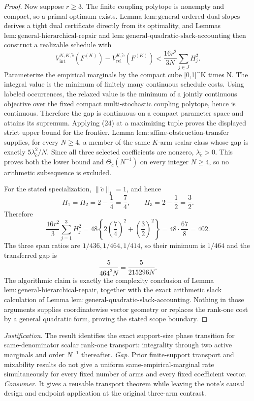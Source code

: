 \documentclass{article}
\begin{document}
\begin{proof}
Now suppose \(r\ge3\).  The finite coupling polytope is nonempty and compact, so a primal optimum exists.  Lemma \(\mathrm{lem{:}general\mbox{-}ordered\mbox{-}dual\mbox{-}slopes}\) derives a tight dual certificate directly from its optimality, and Lemmas \(\mathrm{lem{:}general\mbox{-}hierarchical\mbox{-}repair}\) and \(\mathrm{lem{:}general\mbox{-}quadratic\mbox{-}slack\mbox{-}accounting}\) then construct a realizable schedule with
\[
 V_{\mathrm{int}}^{N,K,\widetilde c}(F^{(K)})-
 V_{\mathrm{rel}}^{K,\widetilde c}(F^{(K)})
 <\frac{16r^2}{3N}\sum_{j\in J}H_j^2. \tag{24}
\]
Parameterize the empirical marginals by the compact cube [0,1]\textasciicircum{}{K times N}.  The integral value is the minimum of finitely many continuous schedule costs.  Using labeled occurrences, the relaxed value is the minimum of a jointly continuous objective over the fixed compact multi-stochastic coupling polytope, hence is continuous.  Therefore the gap is continuous on a compact parameter space and attains its supremum.  Applying (24) at a maximizing tuple proves the displayed strict upper bound for the frontier.  Lemma \(\mathrm{lem{:}affine\mbox{-}obstruction\mbox{-}transfer}\) supplies, for every \(N\ge4\), a member of the same \(K\)-arm scalar class whose gap is exactly \(5\lambda_{\widetilde c}^2/N\).  Since all three selected coefficients are nonzero, \(\lambda_{\widetilde c}>0\).  This proves both the lower bound and \(\Theta_{\widetilde c}(N^{-1})\) on every integer \(N\ge4\), so no arithmetic subsequence is excluded.

For the stated specialization, \(\|\widetilde c\|_1=1\), and hence
\[
 H_1=H_2=2-\frac14=\frac74,\qquad H_3=2-\frac12=\frac32.
\]
Therefore
\[
 \frac{16r^2}{3}\sum_{j=1}^3H_j^2
 =48\left\{2\left(\frac74\right)^2+\left(\frac32\right)^2\right\}
 =48\cdot\frac{67}{8}=402. \tag{25}
\]
The three span ratios are \(1/436,1/464,1/414\), so their minimum is \(1/464\) and the transferred gap is
\[
 \frac{5}{464^2N}=\frac{5}{215296N}. \tag{26}
\]
The algorithmic claim is exactly the complexity conclusion of Lemma \(\mathrm{lem{:}general\mbox{-}hierarchical\mbox{-}repair}\), together with the exact arithmetic slack calculation of Lemma \(\mathrm{lem{:}general\mbox{-}quadratic\mbox{-}slack\mbox{-}accounting}\).  Nothing in those arguments supplies coordinatewise vector geometry or replaces the rank-one cost by a general quadratic form, proving the stated scope boundary.
\end{proof}
\par\smallskip\noindent \textit{Justification.} The result identifies the exact support-size phase transition for same-denominator scalar rank-one transport: integrality through two active marginals and order \(N^{-1}\) thereafter. \textit{Gap.} Prior finite-support transport and mixability results do not give a uniform same-empirical-marginal rate simultaneously for every fixed number of arms and every fixed coefficient vector. \textit{Consumer.} It gives a reusable transport theorem while leaving the note's causal design and endpoint application at the original three-arm contrast.
\end{document}
